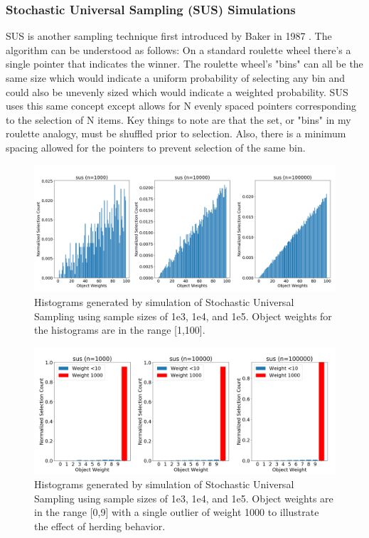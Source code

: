 \documentclass[12pt]{article}
\begin{document}
    \subsubsection{Stochastic Universal Sampling (SUS) Simulations}
    SUS is another sampling technique first introduced by Baker in 1987
    \cite{baker1987}.
    The algorithm can be understood as follows: On a standard roulette wheel
    there's a single pointer that indicates the winner. The roulette wheel's
    "bins" can all be the same size which would indicate a uniform probability
    of selecting any bin and could also be unevenly sized which would indicate
    a weighted probability. SUS uses this same concept except allows for N
    evenly spaced pointers corresponding to the selection of N items. Key
    things to note are that the set, or "bins" in my roulette analogy, must be
    shuffled prior to selection. Also, there is a minimum spacing allowed for
    the pointers to prevent selection of the same bin.

    \begin{figure}[h]
      \centering
      \includegraphics[scale=0.32]{images/herding_roullette.png} 
      \caption{Histograms generated by simulation of Stochastic Universal
               Sampling using sample sizes of 1e3, 1e4, and 1e5. Object weights
               for the histograms are in the range [1,100].}
      \label{fig:herding_roullette}
    \end{figure}

    \begin{figure}[h]
      \centering
      \includegraphics[scale=0.32]{images/pathological_roullette.png} 
      \caption{Histograms generated by simulation of Stochastic Universal
               Sampling using sample sizes of 1e3, 1e4, and 1e5. Object weights
               are in the range [0,9] with a single outlier of weight 1000 to
               illustrate the effect of herding behavior.}
      \label{fig:pathological_roullette}
    \end{figure}
\end{document}
